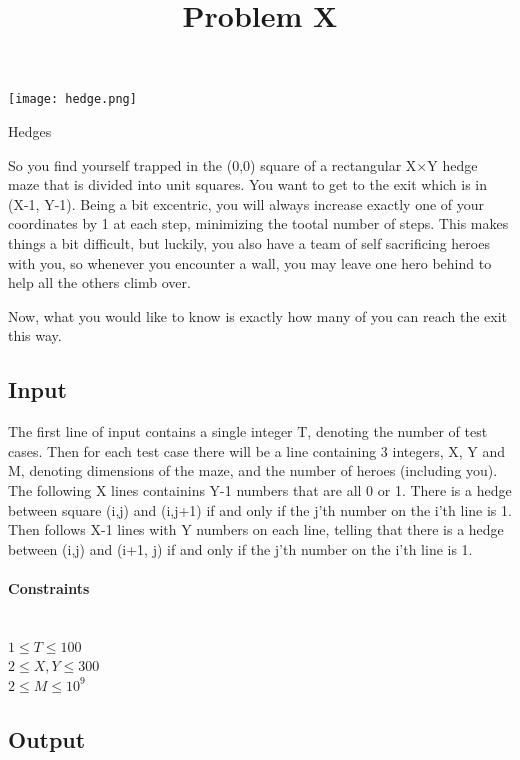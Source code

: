 \documentclass[11pt,a4paper,british]{article}
\title{Problem X}
\date{}
\begin{document}
\maketitle

\texttt{[image: hedge.png]}

\begin{center}
\Huge{Hedges}
\end{center}


So you find yourself trapped in the (0,0) square of a rectangular X$\times$Y hedge maze that is divided into unit squares.  You want to get to the exit which is in (X-1, Y-1).  Being a bit excentric, you will always increase exactly one of your coordinates by 1 at each step, minimizing the tootal number of steps.  This makes things a bit difficult, but luckily, you also have a team of self sacrificing heroes with you, so whenever you encounter a wall, you may leave one hero behind to help all the others climb over.

Now, what you would like to know is exactly how many of you can reach the exit this way.

\subsection*{Input}
The first line of input contains a single integer T, denoting the number of test cases.  Then for each test case there will be a line containing 3 integers, X, Y and M, denoting dimensions of the maze, and the number of heroes (including you).   The following X lines containins Y-1 numbers that are all 0 or 1.  There is a hedge between square (i,j) and (i,j+1) if and only if the j'th number on the i'th line is 1.  Then follows X-1 lines with Y numbers on each line, telling that there is a hedge between (i,j) and (i+1, j) if and only if the j'th number on the i'th line is 1.


\paragraph{Constraints}\ \\
$1\leq T \leq 100$\ \\
$2\leq X,Y \leq 300$\ \\
$2\leq M \leq 10^9$\ \\


\subsection*{Output}
\end{document}
